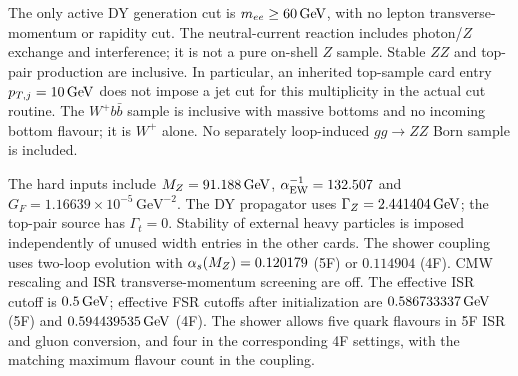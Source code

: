 The only active DY generation cut is $m_{ee}\ge60\,\mathrm{GeV}$, with no
lepton transverse-momentum or rapidity cut. The neutral-current
reaction includes photon/$Z$ exchange and interference; it is not a
pure on-shell $Z$ sample. Stable $ZZ$ and top-pair production are
inclusive. In particular, an inherited top-sample card entry
$p_{T,j}=10\,\mathrm{GeV}$ does not impose a jet cut for this multiplicity in
the actual cut routine. The $W^+b\bar b$ sample is inclusive with
massive bottoms and no incoming bottom flavour; it is $W^+$ alone.
No separately loop-induced $gg\to ZZ$ Born sample is included.

The hard inputs include $M_Z=91.188\,\mathrm{GeV}$,
$\alpha_{\rm EW}^{-1}=132.507$ and
$G_F=1.16639\times10^{-5}\,\mathrm{GeV}^{-2}$. The DY propagator
uses $\Gamma_Z=2.441404\,\mathrm{GeV}$; the top-pair source has
$\Gamma_t=0$. Stability of external heavy particles is imposed
independently of unused width entries in the other cards. The shower
coupling uses two-loop evolution with $\alpha_s(M_Z)=0.120179$ (5F)
or $0.114904$ (4F). CMW rescaling and ISR transverse-momentum
screening are off. The effective ISR cutoff is $0.5\,\mathrm{GeV}$; effective
FSR cutoffs after initialization are $0.586733337\,\mathrm{GeV}$ (5F) and
$0.594439535\,\mathrm{GeV}$ (4F). The shower allows five quark flavours in
5F ISR and gluon conversion, and four in the corresponding 4F
settings, with the matching maximum flavour count in the coupling.

